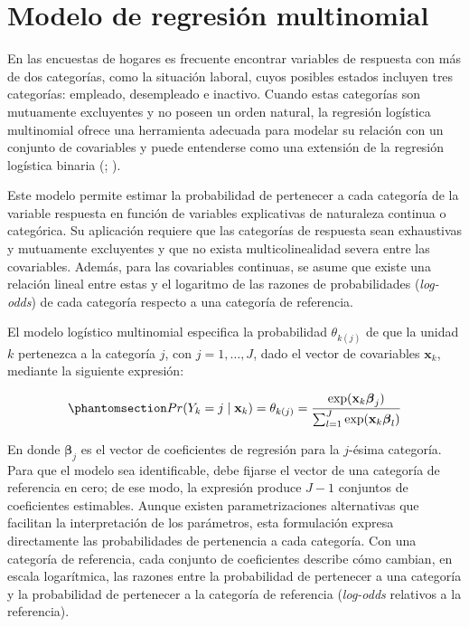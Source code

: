 \documentclass[
  spanish,
  11pt,
  letterpaper,
  oneside,
  open=any]{scrbook}
\begin{document}
\section{Modelo de regresión multinomial}\label{sec-multinomial}

En las encuestas de hogares es frecuente encontrar variables de
respuesta con más de dos categorías, como la situación laboral, cuyos
posibles estados incluyen tres categorías: empleado, desempleado e
inactivo. Cuando estas categorías son mutuamente excluyentes y no poseen
un orden natural, la regresión logística multinomial ofrece una
herramienta adecuada para modelar su relación con un conjunto de
covariables y puede entenderse como una extensión de la regresión
logística binaria (; ).

Este modelo permite estimar la probabilidad de pertenecer a cada
categoría de la variable respuesta en función de variables explicativas
de naturaleza continua o categórica. Su aplicación requiere que las
categorías de respuesta sean exhaustivas y mutuamente excluyentes y que
no exista multicolinealidad severa entre las covariables. Además, para
las covariables continuas, se asume que existe una relación lineal entre
estas y el logaritmo de las razones de probabilidades (\emph{log-odds})
de cada categoría respecto a una categoría de referencia.

El modelo logístico multinomial especifica la probabilidad
\(\theta_{k(j)}\) de que la unidad \(k\) pertenezca a la categoría
\(j\), con \(j=1,\ldots,J\), dado el vector de covariables
\(\mathbf{x}_k\), mediante la siguiente expresión:

\begin{equation}\protect\phantomsection\label{eq-probabilidad-multinomial}{
Pr(Y_{k} = j \mid \mathbf{x}_{k})
=
\theta_{k(j)}
=
\frac{\exp(\mathbf{x}_{k}\boldsymbol{\beta}_j)}
     {\sum_{l=1}^{J} \exp(\mathbf{x}_{k}\boldsymbol{\beta}_l)}
}\end{equation}

En donde \(\boldsymbol{\beta}_j\) es el vector de coeficientes de
regresión para la \(j\)-ésima categoría. Para que el modelo sea
identificable, debe fijarse el vector de una categoría de referencia en
cero; de ese modo, la expresión produce \(J-1\) conjuntos de
coeficientes estimables. Aunque existen parametrizaciones alternativas
que facilitan la interpretación de los parámetros, esta formulación
expresa directamente las probabilidades de pertenencia a cada categoría.
Con una categoría de referencia, cada conjunto de coeficientes describe
cómo cambian, en escala logarítmica, las razones entre la probabilidad
de pertenecer a una categoría y la probabilidad de pertenecer a la
categoría de referencia (\emph{log-odds} relativos a la referencia).
\end{document}
